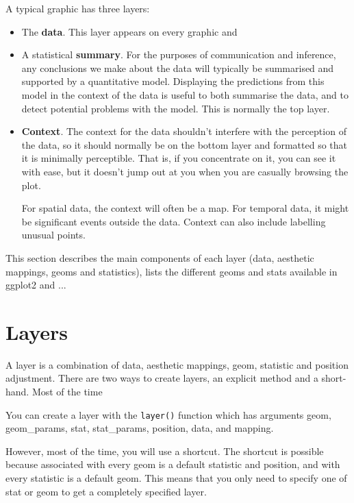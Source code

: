 A typical graphic has three layers:

\begin{itemize}
  \item The {\bf data}.  This layer appears on every graphic and 

  \item A statistical {\bf summary}.  For the purposes of communication and inference, any conclusions we make about the data will typically be summarised and supported by a quantitative model.  Displaying the predictions from this model in the context of the data is useful to both summarise the data, and to detect potential problems with the model.  This is normally the top layer.

  \item {\bf Context}.  The context for the data shouldn't interfere with the perception of the data, so it should normally be on the bottom layer and formatted so that it is minimally perceptible.  That is, if you concentrate on it, you can see it with ease, but it doesn't jump out at you when you are casually browsing the plot.
  
  For spatial data, the context will often be a map.  For temporal data, it might be significant events outside the data.  Context can also include labelling unusual points.
\end{itemize}

This section describes the main components of each layer (data, aesthetic mappings, geoms and statistics), lists the different geoms and stats available in ggplot2 and ...



\section{Layers}
\label{sec:layers}


A layer is a combination of data, aesthetic mappings, geom, statistic and position adjustment.  There are two ways to create layers, an explicit method and a short-hand.  Most of the time 

You can create a layer with the {\tt layer()} function which has arguments geom, geom\_params, stat, stat\_params, position, data, and mapping.

However, most of the time, you will use a shortcut.  The shortcut is possible because associated with every geom is a default statistic and position, and with every statistic is a default geom.  This means that you only need to specify one of stat or geom to get a completely specified layer.

